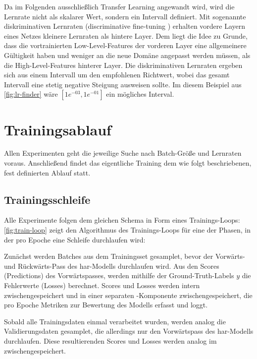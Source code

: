 Da im Folgenden ausschließlich Transfer Learning angewandt wird, wird die Lernrate nicht als skalarer Wert, sondern ein Intervall definiert.
Mit sogenannte diskriminativen Lernraten (discriminative fine-tuning \cite{Howard18}) erhalten vordere Layern eines Netzes kleinere Lernraten als hintere Layer.
Dem liegt die Idee zu Grunde, dass die vortrainierten Low-Level-Features der vorderen Layer eine allgemeinere Gültigkeit haben und weniger an die neue Domäne angepasst werden müssen, als die High-Level-Features hinterer Layer.
Die diskriminativen Lernraten ergeben sich aus einem Intervall um den empfohlenen Richtwert, wobei das gesamt Intervall eine stetig negative Steigung ausweisen sollte.
Im diesem Beispiel aus \autoref{fig:lr-finder} wäre $[1e^{-03}, 1e^{-01}]$ ein mögliches Interval.

\section{Trainingsablauf}
\label{sec:trainingsablauf}

Allen Experimenten geht die jeweilige Suche nach Batch-Größe und Lernraten voraus.
Anschließend findet das eigentliche Training dem wie folgt beschriebenen, fest definierten Ablauf statt.

\subsection{Trainingsschleife}
\label{subsec:trainingsschleife}

Alle Experimente folgen dem gleichen Schema in Form eines Trainings-Loops:
\autoref{fig:train-loop} zeigt den Algorithmus des Trainings-Loops für eine der Phasen, in der pro Epoche eine Schleife durchlaufen wird:

Zunächst werden Batches aus dem Trainingsset gesamplet, bevor der Vorwärts- und Rückwärts-Pass des \gls{har}-Modells durchlaufen wird.
Aus den Scores (Predictions) des Vorwärtspasses, werden mithilfe der Ground-Truth-Labels $y$ die Fehlerwerte (Losses) berechnet.
Scores und Losses werden intern zwischengespeichert und in einer separaten -Komponente zwischengespeichert, die pro Epoche Metriken zur Bewertung des Modells erfasst und loggt.

Sobald alle Trainingsdaten einmal verarbeitet  wurden, werden analog die Validierungsdaten gesamplet, die allerdings nur den Vorwärtspass des \gls{har}-Modells durchlaufen.
Diese resultierenden Scores und Losses werden analog im  zwischengespeichert.

